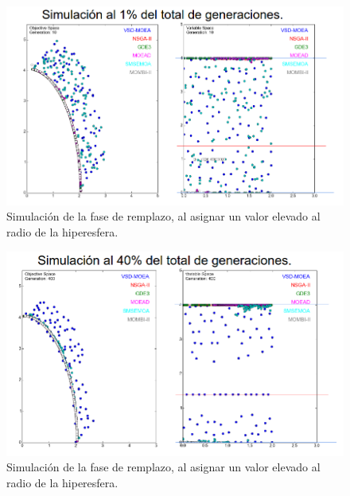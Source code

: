 \begin{figure}[H]
\centering
\scriptsize
\includegraphics[scale=0.35]
{Figures_Chapter3/Simulacion_Algoritmo_2.png}
\decoRule
\caption{Simulación de la fase de remplazo, al asignar un valor elevado al radio de la hiperesfera.}
\label{fig:Simulacion_Algoritmo_2}
\end{figure}


\begin{figure}[H]
\centering
\scriptsize
\includegraphics[scale=0.35]
{Figures_Chapter3/Simulacion_Algoritmo_4.png}
\decoRule
\caption{Simulación de la fase de remplazo, al asignar un valor elevado al radio de la hiperesfera.}
\label{fig:Simulacion_Algoritmo_4}
\end{figure}

